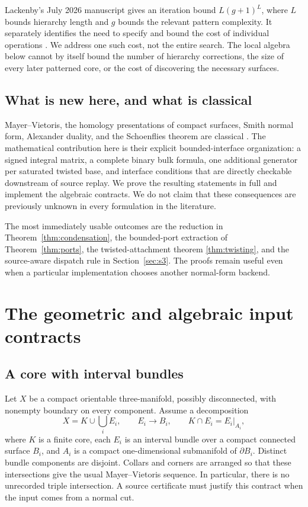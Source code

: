 \documentclass[11pt]{article}
\theoremstyle{definition}
\theoremstyle{remark}
\begin{document}
Lackenby's July 2026 manuscript gives an iteration bound $L(g+1)^L$, where
$L$ bounds hierarchy length and $g$ bounds the relevant pattern complexity.
It separately identifies the need to specify and bound the cost of individual
operations \cite[Section 9]{lackenby-2026}. We address one such cost, not the
entire search. The local algebra below cannot by itself bound the number of
hierarchy corrections, the size of every later patterned core, or the cost
of discovering the necessary surfaces.

\subsection{What is new here, and what is classical}
Mayer--Vietoris, the homology presentations of compact surfaces, Smith normal
form, Alexander duality, and the Schoenflies theorem are classical
\cite{hatcher,brown,kannan-bachem}. The mathematical contribution here is their
explicit bounded-interface organization: a signed integral matrix, a complete
binary bulk formula, one additional generator per saturated twisted base,
and interface conditions that are directly checkable downstream of source
replay. We prove the resulting statements in full and implement the algebraic
contracts. We do not claim that these consequences are previously unknown in
every formulation in the literature.

The most immediately usable outcomes are the reduction in
Theorem~\ref{thm:condensation}, the bounded-port extraction of
Theorem~\ref{thm:ports}, the twisted-attachment theorem
\ref{thm:twisting}, and the source-aware dispatch rule in
Section~\ref{sec:s3}. The proofs remain useful even when a particular
implementation chooses another normal-form backend.

\section{The geometric and algebraic input contracts}
\label{sec:contract}

\subsection{A core with interval bundles}
Let $X$ be a compact orientable three-manifold, possibly disconnected, with
nonempty boundary on every component. Assume a decomposition
\begin{equation}
 X=K\cup\bigcup_i E_i,
 \qquad E_i\longrightarrow B_i,
 \qquad K\cap E_i=E_i|_{A_i},
 \label{eq:decomp}
\end{equation}
where $K$ is a finite core, each $E_i$ is an interval bundle over a compact
connected surface $B_i$, and $A_i$ is a compact one-dimensional submanifold
of $\partial B_i$. Distinct bundle components are disjoint. Collars and
corners are arranged so that these intersections give the usual
Mayer--Vietoris sequence. In particular, there is no unrecorded triple
intersection. A source certificate must justify this contract when the
input comes from a normal cut.
\end{document}
